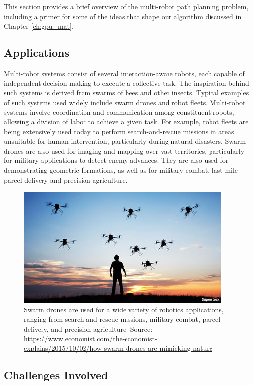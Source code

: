 This section provides a brief overview of the multi-robot path planning problem, including a primer for some of the ideas that shape our algorithm discussed in Chapter \ref{ch:gpu_mat}. 

\subsection{Applications}

Multi-robot systems consist of several interaction-aware robots, each capable of independent decision-making to execute a collective task. The inspiration behind such systems is derived from swarms of bees and other insects. Typical examples of such systems used widely include swarm drones and robot fleets. Multi-robot systems involve coordination and communication among constituent robots, allowing a division of labor to achieve a given task. For example, robot fleets are being extensively used today to perform search-and-rescue missions in areas unsuitable for human intervention, particularly during natural disasters. Swarm drones are also used for imaging and mapping over vast territories, particularly for military applications to detect enemy advances. They are also used for demonstrating geometric formations, as well as for military combat, last-mile parcel delivery and precision agriculture. 

\begin{figure}[ht]
    \centering
    \includegraphics[scale=0.5]{figures/background/swarm_drones.jpg}
    \caption[Swarm Drones]{Swarm drones are used for a wide variety of robotics applications, ranging from search-and-rescue missions, military combat, parcel-delivery, and precision agriculture. Source: \scriptsize{\url{https://www.economist.com/the-economist-explains/2015/10/02/how-swarm-drones-are-mimicking-nature}}}
    \label{fig:swarm-drones}
\end{figure}

\subsection{Challenges Involved}

